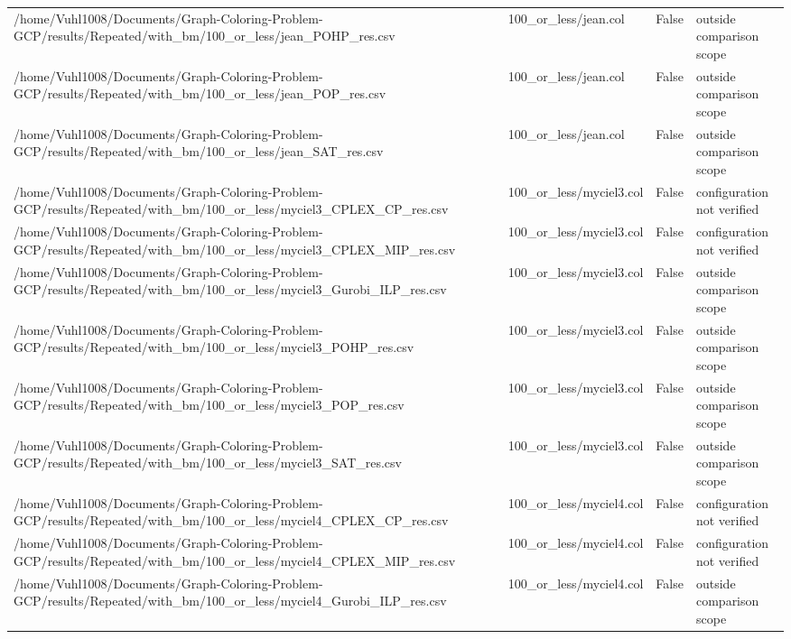 \begin{table}[htbp]
\begin{tabular}{llll}
/home/Vuhl1008/Documents/Graph-Coloring-Problem-GCP/results/Repeated/with\_bm/100\_or\_less/jean\_POHP\_res.csv & 100\_or\_less/jean.col & False & outside comparison scope \\
/home/Vuhl1008/Documents/Graph-Coloring-Problem-GCP/results/Repeated/with\_bm/100\_or\_less/jean\_POP\_res.csv & 100\_or\_less/jean.col & False & outside comparison scope \\
/home/Vuhl1008/Documents/Graph-Coloring-Problem-GCP/results/Repeated/with\_bm/100\_or\_less/jean\_SAT\_res.csv & 100\_or\_less/jean.col & False & outside comparison scope \\
/home/Vuhl1008/Documents/Graph-Coloring-Problem-GCP/results/Repeated/with\_bm/100\_or\_less/myciel3\_CPLEX\_CP\_res.csv & 100\_or\_less/myciel3.col & False & configuration not verified \\
/home/Vuhl1008/Documents/Graph-Coloring-Problem-GCP/results/Repeated/with\_bm/100\_or\_less/myciel3\_CPLEX\_MIP\_res.csv & 100\_or\_less/myciel3.col & False & configuration not verified \\
/home/Vuhl1008/Documents/Graph-Coloring-Problem-GCP/results/Repeated/with\_bm/100\_or\_less/myciel3\_Gurobi\_ILP\_res.csv & 100\_or\_less/myciel3.col & False & outside comparison scope \\
/home/Vuhl1008/Documents/Graph-Coloring-Problem-GCP/results/Repeated/with\_bm/100\_or\_less/myciel3\_POHP\_res.csv & 100\_or\_less/myciel3.col & False & outside comparison scope \\
/home/Vuhl1008/Documents/Graph-Coloring-Problem-GCP/results/Repeated/with\_bm/100\_or\_less/myciel3\_POP\_res.csv & 100\_or\_less/myciel3.col & False & outside comparison scope \\
/home/Vuhl1008/Documents/Graph-Coloring-Problem-GCP/results/Repeated/with\_bm/100\_or\_less/myciel3\_SAT\_res.csv & 100\_or\_less/myciel3.col & False & outside comparison scope \\
/home/Vuhl1008/Documents/Graph-Coloring-Problem-GCP/results/Repeated/with\_bm/100\_or\_less/myciel4\_CPLEX\_CP\_res.csv & 100\_or\_less/myciel4.col & False & configuration not verified \\
/home/Vuhl1008/Documents/Graph-Coloring-Problem-GCP/results/Repeated/with\_bm/100\_or\_less/myciel4\_CPLEX\_MIP\_res.csv & 100\_or\_less/myciel4.col & False & configuration not verified \\
/home/Vuhl1008/Documents/Graph-Coloring-Problem-GCP/results/Repeated/with\_bm/100\_or\_less/myciel4\_Gurobi\_ILP\_res.csv & 100\_or\_less/myciel4.col & False & outside comparison scope \\

\end{tabular}
\end{table}
